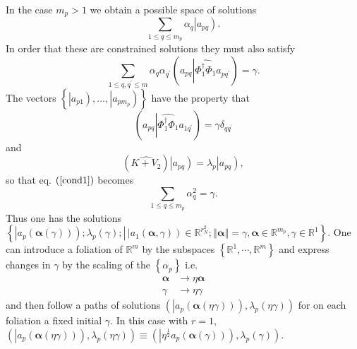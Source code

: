 \documentclass[aps,preprint]{revtex4}%
\begin{document}
In the case $m_{p}>1$ we obtain a possible space of solutions
\begin{equation}
\sum_{1\leq q\leq m_{p}}\alpha_{q}\left\vert \overset{}{a_{pq}}\right)  .
\end{equation}
In order that these are constrained solutions they must also satisfy
\begin{equation}
\sum_{1\leq q,q^{\prime}\leq m}\alpha_{q}\alpha_{q^{\prime}}\left(  \overset
{}{a_{pq}}\left\vert \widehat{\Phi_{1}^{\dagger}\Phi_{1}}\right.  \overset
{}{a_{pq^{\prime}}}\right)  =\gamma. \label{cond1}%
\end{equation}
The vectors $\left\{  \left\vert \overset{}{a_{p1}}\right)  ,\ldots,\left\vert
\overset{}{a_{pm_{p}}}\right)  \right\}  $ have the property that
\begin{equation}
\left(  \overset{}{a_{pq}}\left\vert \widehat{\Phi_{1}^{\dagger}\Phi_{1}%
}\right.  \overset{}{a_{1q^{\prime}}}\right)  =\gamma\delta_{qq^{\prime}}%
\end{equation}
and
\begin{equation}
\left(  \widehat{K+V_{2}}\right)  \left\vert \overset{}{a_{pq}}\right)
=\lambda_{p}\left\vert \overset{}{a_{pq}}\right)  ,
\end{equation}
so that eq. $\left(  \ref{cond1}\right)  $ becomes
\begin{equation}
\sum_{1\leq q\leq m_{p}}\alpha_{q}^{2}=\gamma.
\end{equation}
Thus one has the solutions $\left\{  \left.  \left\vert a_{p}\left(
\mathbf{\alpha}\left(  \gamma\right)  \right)  \right)  ;\lambda_{p}\left(
\gamma\right)  ;\right\vert \,\left\vert a_{1}\left(  \mathbf{\alpha}%
,\gamma\right)  \right)  \in\mathbb{R}^{r_{N}^{2}};\left\Vert \mathbf{\alpha
}\right\Vert =\gamma,\mathbf{\alpha\in}\mathbb{R}^{m_{p}},\gamma\mathbf{\in
}\mathbb{R}^{1}\right\}  .$ One can introduce a foliation of $\mathbb{R}^{m}$
by the subspaces $\left\{  \mathbb{R}^{1},\cdots,\mathbb{R}^{m}\right\}  $ and
express changes in $\gamma$ by the scaling of the $\left\{  \alpha
_{p}\right\}  $ i.e.
\begin{align}
\mathbf{\alpha}  &  \rightarrow\eta\mathbf{\alpha}\nonumber\\
\gamma &  \rightarrow\eta\gamma
\end{align}
and then follow a paths of solutions $\left(  \left\vert a_{p}\left(
\mathbf{\alpha}\left(  \eta\gamma\right)  \right)  \right)  ,\lambda
_{p}\left(  \eta\gamma\right)  \right)  $ for on each foliation a fixed
initial $\gamma$. In this case with $r=1,$ $\left(  \left\vert a_{p}\left(
\mathbf{\alpha}\left(  \eta\gamma\right)  \right)  \right)  ,\lambda
_{p}\left(  \eta\gamma\right)  \right)  \equiv\left(  \left\vert \eta
^{\frac{1}{2}}a_{p}\left(  \mathbf{\alpha}\left(  \gamma\right)  \right)
\right)  ,\lambda_{p}\left(  \gamma\right)  \right)  .$
\end{document}
